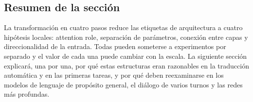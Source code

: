 
\subsection{Resumen de la sección}

La transformación en cuatro pasos reduce las etiquetas de arquitectura a cuatro hipótesis locales: attention role, separación de parámetros, conexión entre capas y direccionalidad de la entrada. Todas pueden someterse a experimentos por separado y el valor de cada una puede cambiar con la escala. La siguiente sección explicará, una por una, por qué estas estructuras eran razonables en la traducción automática y en las primeras tareas, y por qué deben reexaminarse en los modelos de lenguaje de propósito general, el diálogo de varios turnos y las redes más profundas.
